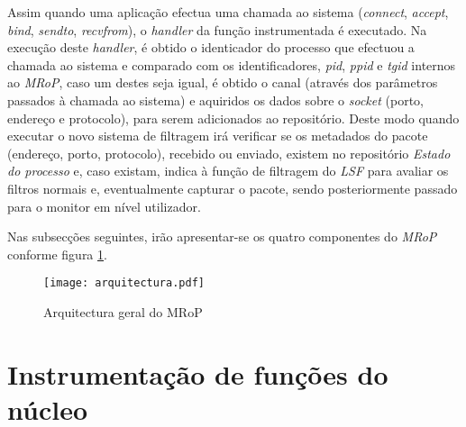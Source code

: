 Assim quando uma aplicação efectua uma chamada ao sistema (\textit{connect}, \textit{accept}, \textit{bind}, \textit{sendto}, \textit{recvfrom}), o \textit{handler} da função instrumentada é executado.
Na execução deste \textit{handler}, é obtido o identicador do processo que efectuou a chamada ao sistema e comparado com os identificadores, \textit{pid}, \textit{ppid} e \textit{tgid} internos ao \textit{MRoP}, caso um destes seja igual, é obtido o canal (através dos parâmetros passados à chamada ao sistema) e aquiridos os dados sobre o \textit{socket} (porto, endereço e protocolo), para serem adicionados ao repositório.
Deste modo quando executar o novo sistema de filtragem irá verificar se os metadados do pacote (endereço, porto, protocolo), recebido ou enviado, existem no repositório \textit{Estado do processo} e, caso existam, indica à função de filtragem do \textit{LSF} para avaliar os filtros normais e, eventualmente capturar o pacote, sendo posteriormente passado para o monitor em nível utilizador.




Nas subsecções seguintes, irão apresentar-se os quatro componentes do \textit{MRoP} conforme figura \ref{fig:general_architecture}.

\begin{figure}[!htbp]
\centering
\texttt{[image: arquitectura.pdf]}
\caption{Arquitectura geral do MRoP}
\label{fig:general_architecture}
\end{figure}



\section{Instrumentação de funções do núcleo}




